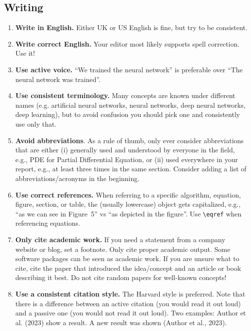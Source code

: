 \documentclass[twoside,11pt]{article}
\begin{document}
\subsection*{Writing}
\begin{enumerate}
    \item \textbf{Write in English.} Either UK or US English is fine, but try to be consistent.
    
    \item \textbf{Write correct English.} Your editor most likely supports spell correction. Use it!
    
    \item \textbf{Use active voice.} ``We trained the neural network'' is preferable over ``The neural network was trained''.  
   
    \item \textbf{Use consistent terminology.} Many concepts are known under different names (e.g. artificial neural networks, neural networks, deep neural networks, deep learning), but to avoid confusion you should pick one and consistently use only that. 
    
    \item \textbf{Avoid abbreviations}. As a rule of thumb, only ever consider abbreviations that are either (i) generally used and understood by everyone in the field, e.g., PDE for Partial Differential Equation, or (ii) used everywhere in your report, e.g., at least three times in the same section. Consider adding a list of abbreviations/acronyms in the beginning.

    \item \textbf{Use correct references.} When referring to a specific algorithm, equation, figure, section, or table, the (usually lowercase) object gets capitalized, e.g., ``as we can see in Figure~5'' vs ``as depicted in the figure''. Use \texttt{\textbackslash eqref} when referencing equations. 

    \item \textbf{Only cite academic work.} If you need a statement from a company website or blog, set a footnote. Only cite proper academic output. Some software packages can be seen as academic work. If you are unsure what to cite, cite the paper that introduced the idea/concept and an article or book describing it best. Do not cite random papers for well-known concepts!
    
    \item \textbf{Use a consistent citation style.} The Harvard style is preferred. Note that there is a difference between an active citation (you would read it out loud) and a passive one (you would not read it out loud). Two examples: Author et al. (2023) show a result. A new result was shown (Author et al., 2023).

\end{enumerate}
\end{document}
